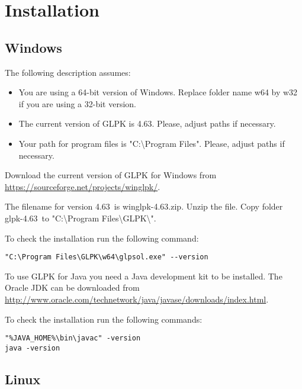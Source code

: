 \documentclass[a4paper,11pt]{report}
\newcommand{\glpkVersionMajor}{4}
\newcommand{\glpkVersionMinor}{63}
\begin{document}
\section{Installation}
\subsection{Windows}

The following description assumes:

\begin{itemize}
\item You are using a 64-bit version of Windows. Replace folder name w64 by w32
if you are using a 32-bit version.
\item The current version of GLPK is \glpkVersionMajor.\glpkVersionMinor.
Please, adjust paths if necessary.
\item Your path for program files is "C:\textbackslash Program Files".
Please, adjust paths if necessary.
\end{itemize}

Download the current version of GLPK for Windows from
\href{https://sourceforge.net/projects/winglpk/}{https://sourceforge.net/projects/winglpk/}.

The filename for version \glpkVersionMajor.\glpkVersionMinor\ is
winglpk-\glpkVersionMajor.\glpkVersionMinor.zip. Unzip the file. Copy folder
glpk-\glpkVersionMajor.\glpkVersionMinor\ to
"C:\textbackslash Program Files\textbackslash GLPK\textbackslash ".

To check the installation run the following command:

\begin{lstlisting}
"C:\Program Files\GLPK\w64\glpsol.exe" --version
\end{lstlisting}

To use GLPK for Java you need a Java development kit to be installed.
The Oracle JDK can be downloaded from
\href{http://www.oracle.com/technetwork/java/javase/downloads/index.html}{http://www.oracle.com/technetwork/java/javase/downloads/index.html}.

To check the installation run the following commands:

\begin{lstlisting}
"%JAVA_HOME%\bin\javac" -version
java -version
\end{lstlisting}

\subsection{Linux}
\end{document}
